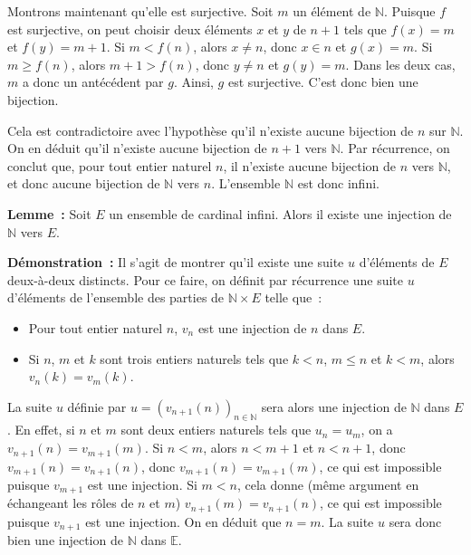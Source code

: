     Montrons maintenant qu'elle est surjective. 
    Soit $m$ un élément de $\mathbb{N}$. 
    Puisque $f$ est surjective, on peut choisir deux éléments $x$ et $y$ de $n+1$ tels que $f(x) = m$ et $f(y) = m+1$.
    Si $m < f(n)$, alors $x \neq n$, donc $x \in n$ et $g(x) = m$. 
    Si $m \geq f(n)$, alors $m+1 > f(n)$, donc $y \neq n$ et $g(y) = m$.
    Dans les deux cas, $m$ a donc un antécédent par $g$.
    Ainsi, $g$ est surjective. 
    C'est donc bien une bijection. 

    Cela est contradictoire avec l'hypothèse qu'il n'existe aucune bijection de $n$ sur $\mathbb{N}$. 
    On en déduit qu'il n'existe aucune bijection de $n+1$ vers $\mathbb{N}$.
    Par récurrence, on conclut que, pour tout entier naturel $n$, il n'existe aucune bijection de $n$ vers $\mathbb{N}$, et donc aucune bijection de $\mathbb{N}$ vers $n$. 
    L'ensemble $\mathbb{N}$ est donc infini.

    \done 

\medskip

\noindent\textbf{Lemme :} Soit $E$ un ensemble de cardinal infini. Alors il existe une injection de $\mathbb{N}$ vers $E$. 

\medskip

\noindent\textbf{Démonstration :} Il s'agit de montrer qu'il existe une suite $u$ d'éléments de $E$ deux-à-deux distincts. 
    Pour ce faire, on définit par récurrence une suite $u$ d'éléments de l'ensemble des parties de $\mathbb{N} \times E$ telle que : 
    \begin{itemize}[nosep]
        \item Pour tout entier naturel $n$, $v_n$ est une injection de $n$ dans $E$.
        \item Si $n$, $m$ et $k$ sont trois entiers naturels tels que $k < n$, $m \leq n$ et $k < m$, alors $v_n(k) = v_m(k)$. 
    \end{itemize}
    La suite $u$ définie par $u = \left( v_{n+1}(n) \right)_{n \in \mathbb{N}}$ sera alors une injection de $\mathbb{N}$ dans $E$. 
    En effet, si $n$ et $m$ sont deux entiers naturels tels que $u_n = u_m$, on a $v_{n+1}(n) = v_{m+1}(m)$. 
    Si $n < m$, alors $n < m+1$ et $n < n+1$, donc $v_{m+1}(n) = v_{n+1}(n)$, donc $v_{m+1}(n) = v_{m+1}(m)$, ce qui est impossible puisque $v_{m+1}$ est une injection.
    Si $m < n$, cela donne (même argument en échangeant les rôles de $n$ et $m$) $v_{n+1}(m) = v_{n+1}(n)$, ce qui est impossible puisque $v_{n+1}$ est une injection. 
    On en déduit que $n=m$. 
    La suite $u$ sera donc bien une injection de $\mathbb{N}$ dans $\mathbb{E}$.

